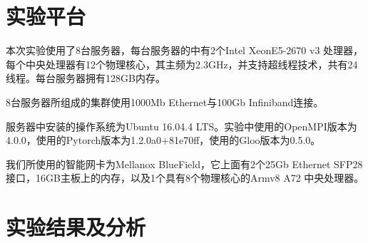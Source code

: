 \section{实验平台}
本次实验使用了8台服务器，每台服务器的中有2个Intel XeonE5-2670 v3 处理器，每个中央处理器有12个物理核心，其主频为2.3GHz，并支持超线程技术，共有24线程。每台服务器拥有128GB内存。

8台服务器所组成的集群使用1000Mb Ethernet与100Gb Infiniband连接。

服务器中安装的操作系统为Ubuntu 16.04.4 LTS。实验中使用的OpenMPI版本为4.0.0，使用的Pytorch版本为1.2.0a0+81e70ff，使用的Gloo版本为0.5.0。

我们所使用的智能网卡为Mellanox BlueField，它上面有2个25Gb Ethernet SFP28 接口，16GB主板上的内存，以及1个具有8个物理核心的Armv8 A72 中央处理器。

\section{实验结果及分析}